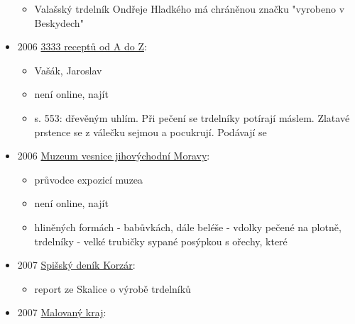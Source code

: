\begin{itemize}
  \begin{itemize}
  \tightlist
  \item
    Valašský trdelník Ondřeje Hladkého má chráněnou značku "vyrobeno v
    Beskydech"
  \end{itemize}
\item
  2006
  \href{https://ceskadigitalniknihovna.cz/uuid/uuid:616f5dc0-6adb-11e7-b92d-005056827e51}{3333
  receptů od A do Z}:

  \begin{itemize}
  \tightlist
  \item
    Vašák, Jaroslav
  \item
    není online, najít
  \item
    s. 553: dřevěným uhlím. Při pečení se trdelníky potírají máslem.
    Zlatavé prstence se z válečku sejmou a pocukrují. Podávají se
  \end{itemize}
\item
  2006
  \href{https://ceskadigitalniknihovna.cz/uuid/uuid:a7380140-967b-11e9-9209-005056827e51}{Muzeum
  vesnice jihovýchodní Moravy}:

  \begin{itemize}
  \tightlist
  \item
    průvodce expozicí muzea
  \item
    není online, najít
  \item
    hliněných formách - babůvkách, dále beléše - vdolky pečené na
    plotně, trdelníky - velké trubičky sypané posýpkou s ořechy, které
  \end{itemize}
\item
  2007
  \href{https://dikda.snk.sk/uuid/uuid:36e701c1-1689-4807-876f-6895e3c17a3c}{Spišský
  deník Korzár}:

  \begin{itemize}
  \tightlist
  \item
    report ze Skalice o výrobě trdelníků
  \end{itemize}
\item
  2007
  \href{https://ceskadigitalniknihovna.cz/uuid/uuid:889f61a0-f31b-11e3-97c9-001018b5eb5c}{Malovaný
  kraj}:


\end{itemize}
